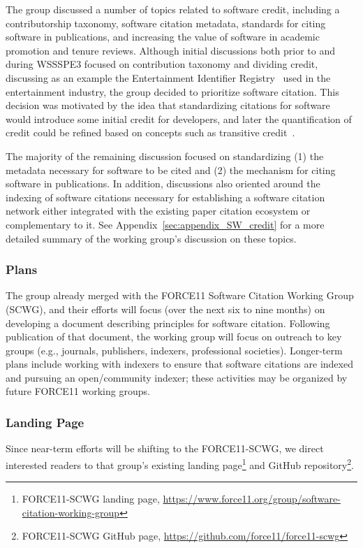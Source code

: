 The group discussed a number of topics related to software credit, including a contributorship taxonomy, software citation metadata, standards for citing software in publications, and increasing the value of software in academic promotion and tenure reviews.
Although initial discussions both prior to and during WSSSPE3 focused on contribution taxonomy and dividing credit, discussing as an example the Entertainment Identifier Registry~\cite{EIDR} used in the entertainment industry, the group decided to prioritize software citation.
This decision was motivated by the idea that standardizing citations for software would introduce some initial credit for developers, and later the quantification of credit could be refined based on concepts such as transitive credit~\cite{wssspe2_katz,Katz:2014_tc}.

The majority of the remaining discussion focused on standardizing (1) the metadata necessary for software to be cited and (2) the mechanism for citing software in publications.
In addition, discussions also oriented around the indexing of software citations necessary for establishing a software citation network either integrated with the existing paper citation ecosystem or complementary to it.
See Appendix~\ref{sec:appendix_SW_credit} for a more detailed summary of the working group's discussion on these topics.

\subsubsection{Plans}

The group already merged with the FORCE11 Software Citation Working Group (SCWG), and their efforts will focus (over the next six to nine months) on developing a document describing principles for software citation.
Following publication of that document, the working group will focus on outreach to key groups (e.g., journals, publishers, indexers, professional societies).
Longer-term plans include working with indexers to ensure that software citations are indexed and pursuing an open\slash community indexer; these activities may be organized by future FORCE11 working groups.

\subsubsection{Landing Page}

Since near-term efforts will be shifting to the FORCE11-SCWG, we direct interested readers to that group's existing landing page\footnote{FORCE11-SCWG landing page, \url{https://www.force11.org/group/software-citation-working-group}} and GitHub repository\footnote{FORCE11-SCWG GitHub page,  \url{https://github.com/force11/force11-scwg}}.